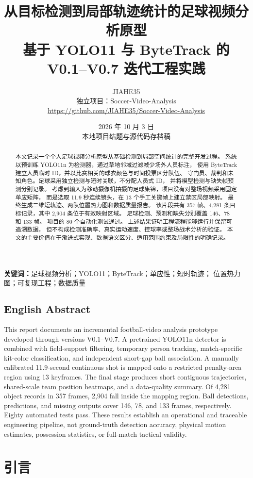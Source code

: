 \documentclass[UTF8,fontset=fandol,11pt,a4paper]{ctexart}
\title{\textbf{从目标检测到局部轨迹统计的足球视频分析原型}\\
  \large 基于 YOLO11 与 ByteTrack 的 V0.1--V0.7 迭代工程实践}
\author{JIAHE35\\
  \small 独立项目：Soccer-Video-Analysis\\
  \small \url{https://github.com/JIAHE35/Soccer-Video-Analysis}}
\date{2026 年 10 月 3 日\\\small 本地项目结题与源代码存档稿}
\begin{document}
\maketitle

\begin{abstract}
本文记录一个个人足球视频分析原型从基础检测到局部空间统计的完整开发过程。
系统以预训练 YOLO11n 为检测器，通过草地邻域过滤减少场外人员标注，
使用 ByteTrack 建立人员临时 ID，并以比赛相关的球衣颜色与时间投票区分队伍、
守门员、裁判和未知角色。足球采用独立检测与短时关联，不分配人员式 ID，
并将模型检测与缺失帧预测分别记录。
考虑到输入为移动摄像机拍摄的足球集锦，项目没有对整场视频采用固定单应矩阵，
而是选取 11.9 秒连续镜头，在 13 个手工关键帧上建立禁区局部映射。
最终生成二维短轨迹、两队位置热力图和数据质量报告。
该片段共有 357 帧、4,281 条目标记录，其中 2,904 条位于有效映射区域。
足球检测、预测和缺失分别覆盖 146、78 和 133 帧。
项目的 80 个自动化测试通过。
上述结果证明工程流程能够运行并保留可追溯数据，
但不构成检测准确率、真实运动速度、控球率或整场战术分析的验证。
本文的主要价值在于渐进式实现、数据语义区分、适用范围约束及局限性的明确记录。
\end{abstract}

\noindent\textbf{关键词：}足球视频分析；YOLO11；ByteTrack；单应性；短时轨迹；
位置热力图；可复现工程；数据质量

\subsection*{English Abstract}
This report documents an incremental football-video analysis prototype developed
through versions V0.1--V0.7. A pretrained YOLO11n detector is combined with
field-support filtering, temporary person tracking, match-specific kit-color
classification, and independent short-gap ball association. A manually calibrated
11.9-second continuous shot is mapped onto a restricted penalty-area region
using 13 keyframes. The final stage produces short contiguous trajectories,
shared-scale team position heatmaps, and a data-quality summary. Of 4,281
object records in 357 frames, 2,904 fall inside the mapping region. Ball
detections, predictions, and missing outputs cover 146, 78, and 133 frames,
respectively. Eighty automated tests pass. These results establish an operational
and traceable engineering pipeline, not ground-truth detection accuracy,
physical motion estimates, possession statistics, or full-match tactical validity.

\tableofcontents
\clearpage

\section{引言}
\end{document}
